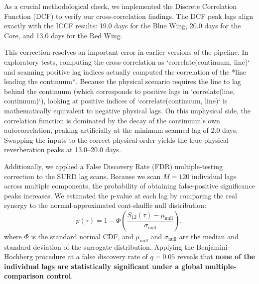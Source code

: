 \documentclass[12pt, a4paper]{article}
\begin{document}
As a crucial methodological check, we implemented the Discrete Correlation Function (DCF) to verify our cross-correlation findings. The DCF peak lags align exactly with the ICCF results: 19.0 days for the Blue Wing, 20.0 days for the Core, and 13.0 days for the Red Wing.

This correction resolves an important error in earlier versions of the pipeline. In exploratory tests, computing the cross-correlation as `correlate(continuum, line)` and scanning positive lag indices actually computed the correlation of the *line leading the continuum*. Because the physical scenario requires the line to lag behind the continuum (which corresponds to positive lags in `correlate(line, continuum)`), looking at positive indices of `correlate(continuum, line)` is mathematically equivalent to negative physical lags. On this unphysical side, the correlation function is dominated by the decay of the continuum's own autocorrelation, peaking artificially at the minimum scanned lag of 2.0 days. Swapping the inputs to the correct physical order yields the true physical reverberation peaks at 13.0--20.0 days.

Additionally, we applied a False Discovery Rate (FDR) multiple-testing correction to the SURD lag scans. Because we scan $M=120$ individual lags across multiple components, the probability of obtaining false-positive significance peaks increases. We estimated the p-value at each lag by comparing the real synergy to the normal-approximated cont-shuffle null distribution:
\begin{equation}
p(\tau) = 1 - \Phi\left(\frac{S_{12}(\tau) - \mu_{\mathrm{null}}}{\sigma_{\mathrm{null}}}\right),
\end{equation}
where $\Phi$ is the standard normal CDF, and $\mu_{\mathrm{null}}$ and $\sigma_{\mathrm{null}}$ are the median and standard deviation of the surrogate distribution. Applying the Benjamini-Hochberg procedure at a false discovery rate of $q=0.05$ reveals that \textbf{none of the individual lags are statistically significant under a global multiple-comparison control}.
\end{document}
